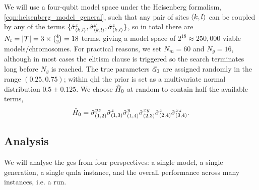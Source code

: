 We will use a four-qubit \gls{model space} under the Heisenberg formalism, \cref{eqn:heisenberg_model_general}, 
    such that any pair of sites ${ \langle k, l \rangle }$ can be coupled by any of the terms $\{\hat{\sigma}^x_{{ \langle k, l \rangle }}, \hat{\sigma}^y_{{ \langle k, l \rangle }}, \hat{\sigma}^z_{{ \langle k, l \rangle }}\}$, 
    so in total there are $N_t = |\mathcal{T}| = 3 \times {4 \choose 2} = 18$ terms, 
    giving a \gls{model space} of $2^{18} \approx 250,000$ viable models/chromosomes. 
For practical reasons\footnotemark, we set $N_m=60$ and $N_g=16$, although in most cases the 
    elitism clause is triggered so the search terminates long before $N_g$ is reached. 
The true parameters $\vec{\alpha}_0$ are assigned randomly in the range $(0.25, 0.75)$; 
    within \gls{qhl} the prior is set as a multivariate normal distribution $0.5 \pm 0.125$. 
We choose $\hat{H}_0$ at random to contain half the available terms\footnotemark,
\begin{equation}
    \label{eqn:gen_alg_true_model}
    \hat{H}_0 = \hat{\sigma}_{(1, 2)}^{yz}\hat{\sigma}_{(1, 3)}^{z}\hat{\sigma}_{(1, 4)}^{y}\hat{\sigma}_{(2, 3)}^{xy}\hat{\sigma}_{(2, 4)}^{x}\hat{\sigma}_{(3, 4)}^{xz}.
\end{equation} 
\par 
\subsection{Analysis}
We will analyse the \gls{ges} from four perspectives: 
    a single model, a single generation, a single \gls{qmla} \gls{instance}, 
    and the overall performance across many instances, i.e. a \gls{run}.
\par 

